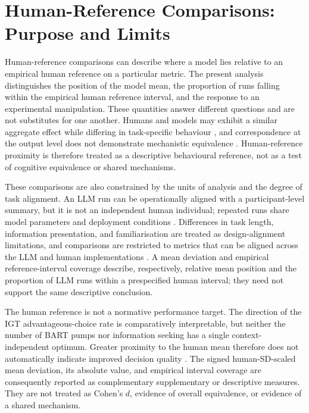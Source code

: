 \documentclass[logo,msc]{infthesis}
\begin{document}
\section{Human-Reference Comparisons: Purpose and Limits}

Human-reference comparisons can describe where a model lies relative to an empirical human reference on a particular metric. The present analysis distinguishes the position of the model mean, the proportion of runs falling within the empirical human reference interval, and the response to an experimental manipulation. These quantities answer different questions and are not substitutes for one another. Humans and models may exhibit a similar aggregate effect while differing in task-specific behaviour \cite{Lampinen2024ContentEffects}, and correspondence at the output level does not demonstrate mechanistic equivalence \cite{Lin2025SixFallacies}. Human-reference proximity is therefore treated as a descriptive behavioural reference, not as a test of cognitive equivalence or shared mechanisms.

These comparisons are also constrained by the units of analysis and the degree of task alignment. An LLM run can be operationally aligned with a participant-level summary, but it is not an independent human individual; repeated runs share model parameters and deployment conditions \cite{Dillion2023ReplaceParticipants,Bisbee2024SyntheticSurveyData}. Differences in task length, information presentation, and familiarisation are treated as design-alignment limitations, and comparisons are restricted to metrics that can be aligned across the LLM and human implementations \cite{Wilson2014,Buelow2009IGTValidity,Wallsten2005BARTModel}. A mean deviation and empirical reference-interval coverage describe, respectively, relative mean position and the proportion of LLM runs within a prespecified human interval; they need not support the same descriptive conclusion.

The human reference is not a normative performance target. The direction of the IGT advantageous-choice rate is comparatively interpretable, but neither the number of BART pumps nor information seeking has a single context-independent optimum. Greater proximity to the human mean therefore does not automatically indicate improved decision quality \cite{Wilson2014,Buelow2009IGTValidity,Wallsten2005BARTModel}. The signed human-SD-scaled mean deviation, its absolute value, and empirical interval coverage are consequently reported as complementary supplementary or descriptive measures. They are not treated as Cohen's \(d\), evidence of overall equivalence, or evidence of a shared mechanism.
\end{document}
